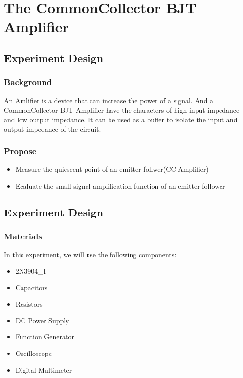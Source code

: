 \section{The Common\-Collector BJT Amplifier}

\subsection{Experiment Design}
    \subsubsection{Background}
    An Amlifier is a device that can increase the power of a signal.
    And a Common\-Collector BJT Amplifier have the characters of high input impedance and low output impedance.
    It can be used as a buffer to isolate the input and output impedance of the circuit.\par

    \subsubsection{Propose}
    \begin{itemize}
        \item Measure the quiescent-point of an emitter follwer(CC Amplifier)
        \item Ecaluate the small-signal amplification function of an emitter follower
    \end{itemize}

\subsection{Experiment Design}
    \subsubsection{Materials}
        In this experiment, we will use the following components:
        \begin{itemize}
            \item 2N3904\_1
            \item Capacitors
            \item Resistors
            \item DC Power Supply
            \item Function Generator
            \item Oscilloscope
            \item Digital Multimeter
        \end{itemize}
